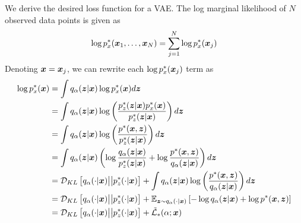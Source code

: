 We derive the desired loss function for a VAE. The log marginal likelihood of $N$ observed data points is given as
\begin{equation}
  \log p_x^*(\boldsymbol{x}_1,\ldots,\boldsymbol{x}_N) = \sum_{j=1}^N \log p_x^*(\boldsymbol{x}_j)
  \label{eq:vae_marginal}
\end{equation}
Denoting $\boldsymbol{x} = \boldsymbol{x}_j$, we can rewrite each $\log p_x^*(\boldsymbol{x}_j)$ term as 
\begin{equation}
  \begin{split}
    \log p_x^*(\boldsymbol{x}) &= \int q_\alpha(\boldsymbol{z} |\boldsymbol{x}) \log p_x^*(\boldsymbol{x})d\boldsymbol{z} \\
    &= \int q_\alpha(\boldsymbol{z} | \boldsymbol{x}) \log \left( \frac{p_z^*(\boldsymbol{z} | \boldsymbol{x}) p_x^*(\boldsymbol{x})}{p_z^*(\boldsymbol{z} | \boldsymbol{x})} \right) d\boldsymbol{z}  \\
    &= \int q_\alpha(\boldsymbol{z} | \boldsymbol{x}) \log \left( \frac{p^*(\boldsymbol{x}, \boldsymbol{z})}{p_z^*(\boldsymbol{z} | \boldsymbol{x})} \right) d\boldsymbol{z}\\
    &= \int q_\alpha(\boldsymbol{z} | \boldsymbol{x}) \left( \log \frac{q_\alpha(\boldsymbol{z} | \boldsymbol{x})}{p_z^*(\boldsymbol{z} | \boldsymbol{x})} + \log \frac{p^*(\boldsymbol{x}, \boldsymbol{z})}{q_\alpha(\boldsymbol{z} | \boldsymbol{x})}\right) d\boldsymbol{z} \\
    &= \mathcal{D}_{KL}\left[ q_\alpha(\cdot |\boldsymbol{x}) \big|\big| p_z^*(\cdot | \boldsymbol{x}) \right] + \int q_\alpha(\boldsymbol{z} | \boldsymbol{x}) \log \left( \frac{p^*(\boldsymbol{x}, \boldsymbol{z})}{q_\alpha(\boldsymbol{z} | \boldsymbol{x})} \right)d\boldsymbol{z} \\
    &= \mathcal{D}_{KL}\left[ q_\alpha(\cdot |\boldsymbol{x}) \big|\big| p_z^*(\cdot | \boldsymbol{x}) \right] + {\displaystyle\mathbb{E}_{\boldsymbol{z}\sim q_\alpha(\cdot | \boldsymbol{x})}}\left[ -\log q_\alpha(\boldsymbol{z} | \boldsymbol{x}) + \log p^*(\boldsymbol{x}, \boldsymbol{z}) \right] \\
    &= \mathcal{D}_{KL}\left[ q_\alpha(\cdot |\boldsymbol{x}) \big|\big| p_z^*(\cdot | \boldsymbol{x}) \right] + \tilde{\mathcal{L}}_*(\alpha; \boldsymbol{x})
\label{eq:vae_derive}
  \end{split}
\end{equation}

